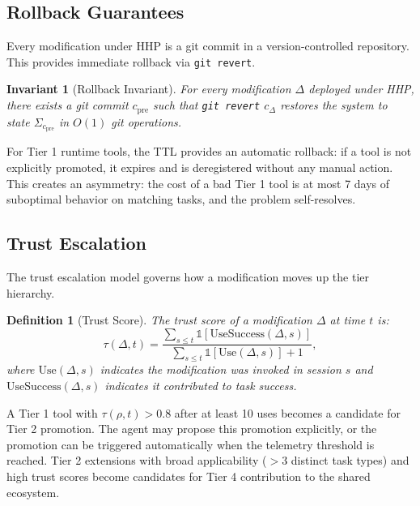 \documentclass[11pt]{article}
\newtheorem{definition}{Definition}
\newtheorem{invariant}{Invariant}
\begin{document}
\subsection{Rollback Guarantees}
\label{sec:rollback}

Every modification under HHP is a git commit in a version-controlled repository.
This provides immediate rollback via \texttt{git revert}.

\begin{invariant}[Rollback Invariant]
For every modification $\Delta$ deployed under HHP, there exists a git commit
$c_{\text{pre}}$ such that \texttt{git revert} $c_\Delta$ restores the system
to state $\Sigma_{c_{\text{pre}}}$ in $O(1)$ git operations.
\end{invariant}

For Tier 1 runtime tools, the TTL provides an automatic rollback: if a tool is
not explicitly promoted, it expires and is deregistered without any manual action.
This creates an asymmetry: the cost of a bad Tier 1 tool is at most 7 days of
suboptimal behavior on matching tasks, and the problem self-resolves.

\subsection{Trust Escalation}
\label{sec:trust}

The trust escalation model governs how a modification moves up the tier hierarchy.

\begin{definition}[Trust Score]
The \emph{trust score} of a modification $\Delta$ at time $t$ is:
\begin{equation}
    \tau(\Delta, t) = \frac{\sum_{s \leq t} \mathbb{1}[\text{UseSuccess}(\Delta, s)]}
                          {\sum_{s \leq t} \mathbb{1}[\text{Use}(\Delta, s)] + 1},
\end{equation}
where $\text{Use}(\Delta, s)$ indicates the modification was invoked in session
$s$ and $\text{UseSuccess}(\Delta, s)$ indicates it contributed to task success.
\end{definition}

A Tier 1 tool with $\tau(\rho, t) > 0.8$ after at least 10 uses becomes a
candidate for Tier 2 promotion. The agent may propose this promotion explicitly,
or the promotion can be triggered automatically when the telemetry threshold is
reached. Tier 2 extensions with broad applicability ($> 3$ distinct task types)
and high trust scores become candidates for Tier 4 contribution to the shared
ecosystem.
\end{document}
